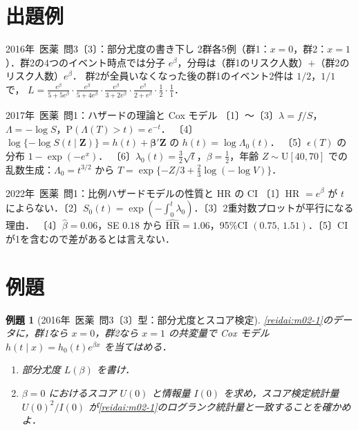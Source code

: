 \documentclass[a4paper,11pt,openany]{ltjsbook}
\newtheorem{reidai}{例題}[chapter]
\newcommand{\kakomon}[2]{\mbox{#1年 医薬 問#2}}
\newcommand{\Prob}{\mathrm{P}}
\newcommand{\HR}{\mathrm{HR}}
\newcommand{\Unif}{\mathrm{U}}
\begin{document}
\section{出題例}\label{sec:m03-shutsudai}
\begin{shutsudai}{\kakomon{2016}{3}〔3〕：部分尤度の書き下し}
2群各5例（群1：$x=0$，群2：$x=1$）．群2の4つのイベント時点では分子 $e^\beta$，分母は（群1のリスク人数）$+$（群2のリスク人数）$e^\beta$．
群2が全員いなくなった後の群1のイベント2件は $1/2$，$1/1$ で，
$L=\frac{e^\beta}{5+5e^\beta}\cdot\frac{e^\beta}{5+4e^\beta}\cdot\frac{e^\beta}{3+2e^\beta}\cdot\frac{e^\beta}{2+e^\beta}\cdot\frac12\cdot\frac11$．
\end{shutsudai}
\begin{shutsudai}{\kakomon{2017}{1}：ハザードの理論と Cox モデル}
〔1〕〜〔3〕$\lambda=f/S$，$\Lambda=-\log S$，$\Prob(\Lambda(T)>t)=e^{-t}$．
〔4〕$\log\{-\log S(t\mid\bm Z)\}=h(t)+\bm\beta'\bm Z$ の $h(t)=\log\Lambda_0(t)$．
〔5〕$\epsilon(T)$ の分布 $1-\exp(-e^x)$．
〔6〕$\lambda_0(t)=\frac32\sqrt t$，$\beta=\frac12$，年齢 $Z\sim\Unif[40,70]$ での乱数生成：$\Lambda_0=t^{3/2}$ から $T=\exp\{-Z/3+\frac23\log(-\log V)\}$．
\end{shutsudai}
\begin{shutsudai}{\kakomon{2022}{1}：比例ハザードモデルの性質と HR の CI}
〔1〕HR $=e^\beta$ が $t$ によらない．〔2〕$S_0(t)=\exp(-\int_0^t\lambda_0)$．〔3〕2重対数プロットが平行になる理由．
〔4〕$\hat\beta=0.06$，SE $0.18$ から $\widehat{\HR}=1.06$，95\%CI $(0.75,\,1.51)$．〔5〕CI が1を含むので差があるとは言えない．
\end{shutsudai}

\section{例題}\label{sec:m03-reidai}
\begin{reidai}[\kakomon{2016}{3}〔3〕型：部分尤度とスコア検定]\label{reidai:m03-1}
\cref{reidai:m02-1}のデータに，群1なら $x=0$，群2なら $x=1$ の共変量で Cox モデル $h(t\mid x)=h_0(t)e^{\beta x}$ を当てはめる．
\begin{enumerate}[label=〔\arabic*〕]
\item 部分尤度 $L(\beta)$ を書け．
\item $\beta=0$ におけるスコア $U(0)$ と情報量 $I(0)$ を求め，スコア検定統計量 $U(0)^2/I(0)$ が\cref{reidai:m02-1}のログランク統計量と一致することを確かめよ．
\end{enumerate}
\end{reidai}
\end{document}
